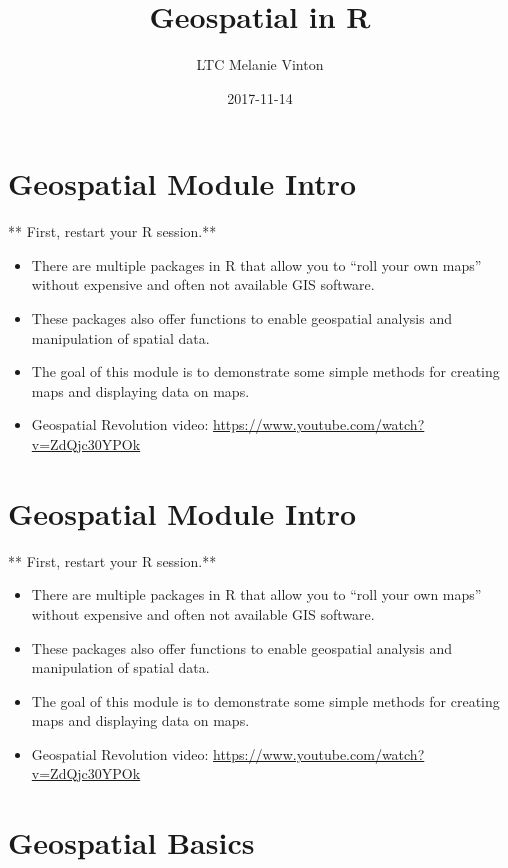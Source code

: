 \documentclass[oneside]{memoir}
\title{Geospatial in R}
\author{LTC Melanie Vinton}
\date{2017-11-14}
\theoremstyle{definition}
\theoremstyle{definition}
\theoremstyle{definition}
\theoremstyle{remark}
\begin{document}
\maketitle

{
\setcounter{tocdepth}{1}
\tableofcontents
}
\chapter{Geospatial Module Intro}\label{geospatial-module-intro}

** First, restart your R session.**

\begin{itemize}
\item
  There are multiple packages in R that allow you to ``roll your own
  maps'' without expensive and often not available GIS software.
\item
  These packages also offer functions to enable geospatial analysis and
  manipulation of spatial data.
\item
  The goal of this module is to demonstrate some simple methods for
  creating maps and displaying data on maps.
\item
  Geospatial Revolution video:
  \url{https://www.youtube.com/watch?v=ZdQjc30YPOk}
\end{itemize}

\chapter{Geospatial Module Intro}\label{geospatial-module-intro-1}

** First, restart your R session.**

\begin{itemize}
\item
  There are multiple packages in R that allow you to ``roll your own
  maps'' without expensive and often not available GIS software.
\item
  These packages also offer functions to enable geospatial analysis and
  manipulation of spatial data.
\item
  The goal of this module is to demonstrate some simple methods for
  creating maps and displaying data on maps.
\item
  Geospatial Revolution video:
  \url{https://www.youtube.com/watch?v=ZdQjc30YPOk}
\end{itemize}

\chapter{Geospatial Basics}\label{geospatial-basics}
\end{document}

